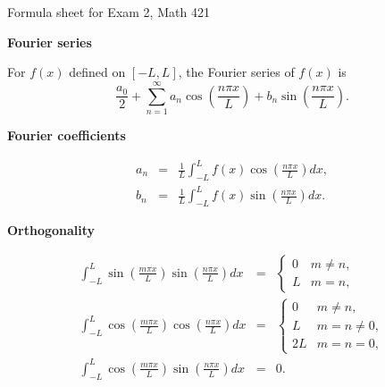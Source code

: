 \documentclass[10pt]{article}
\begin{document}
\begin{center}
	 {\Large \sc Formula sheet for Exam 2, Math 421
\par} 	\end{center}

{\bf Fourier series} 

For $f(x)$ defined on $[-L, L]$, the Fourier series 
of $f(x)$ is 
$$\frac{a_{0}}{2}+\sum_{n=1}^{\infty}a_{n}\cos 
\left(\frac{n\pi x}{L}\right)+b_{n}\sin 
\left(\frac{n\pi x}{L}\right).$$

{\bf Fourier coefficients}

\begin{eqnarray*}
a_{n}&=&\frac{1}{L}\int_{-L}^{L}f(x)\cos 
\left(\frac{n\pi x}{L}\right)dx,\\
b_{n}&=&\frac{1}{L}\int_{-L}^{L}f(x)\sin 
\left(\frac{n\pi x}{L}\right)dx.
\end{eqnarray*}

{\bf Orthogonality}

\begin{eqnarray*}
\int_{-L}^{L}\sin \left(\frac{m\pi x}{L}\right)
\sin \left(\frac{n\pi x}{L}\right)dx&=&\left\{\begin{array}{ll}
0&m\ne n,\\ L&m=n,\end{array}\right. \\
\int_{-L}^{L}\cos \left(\frac{m\pi x}{L}\right)
\cos \left(\frac{n\pi x}{L}\right)dx&=&\left\{\begin{array}{ll}
0&m\ne n,\\ L&m=n\ne 0,\\ 2L&m=n=0,
\end{array}\right. \\
\int_{-L}^{L}\cos \left(\frac{m\pi x}{L}\right)
\sin \left(\frac{n\pi x}{L}\right)dx&=&0. 
\end{eqnarray*}
\end{document}
